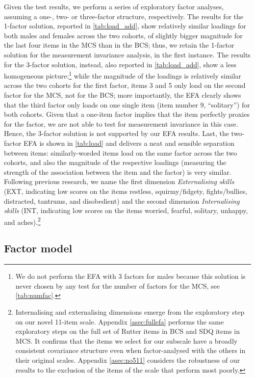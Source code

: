 Given the test results, we perform a series of exploratory factor analyses, assuming a one-, two- or three-factor structure, respectively. The results for the 1-factor solution, reported in \autoref{tab:load_add}, show relatively similar loadings for both males and females across the two cohorts, of slightly bigger magnitude for the last four items in the MCS than in the BCS; thus, we retain the 1-factor solution for the measurement invariance analysis, in the first instance. The results for the 3-factor solution, instead, also reported in \autoref{tab:load_add}, show a less homogeneous picture:\footnote{We do not perform the EFA with 3 factors for males because this solution is never chosen by any test for the number of factors for the MCS, see \autoref{tab:numfac}.} while the magnitude of the loadings is relatively similar across the two cohorts for the first factor, items 3 and 5 only load on the second factor for the MCS, not for the BCS; more importantly, the EFA clearly shows that the third factor only loads on one single item (item number 9, ``solitary'') for both cohorts. Given that a one-item factor implies that the item perfectly proxies for the factor, we are not able to test for measurement invariance in this case. Hence, the 3-factor solution is not supported by our EFA results. Last, the two-factor EFA is shown in \autoref{tab:load} and delivers a neat and sensible separation between items: similarly-worded items load on the same factor across the two cohorts, and also the magnitude of the respective loadings (measuring the strength of the association between the item and the factor) is very similar. Following previous research, we name the first dimension \emph{Externalising skills} (EXT, indicating low scores on the items restless, squirmy/fidgety, fights/bullies, distracted, tantrums, and disobedient) and the second dimension \emph{Internalising skills} (INT, indicating low scores on the items worried, fearful, solitary, unhappy, and aches).\footnote{Internalising and externalising dimensions emerge from the exploratory step on our novel 11-item scale. Appendix \autoref{asec:fullefa} performs the same exploratory steps on the full set of Rutter items in BCS and SDQ items in MCS. It confirms that the items we select for our subscale have a broadly consistent covariance structure even when factor-analysed with the others in their original scales. Appendix \autoref{asec:no511} considers the robustness of our results to the exclusion of the items of the scale that perform most poorly.} 

\subsection{Factor model \label{sec:fm}}

